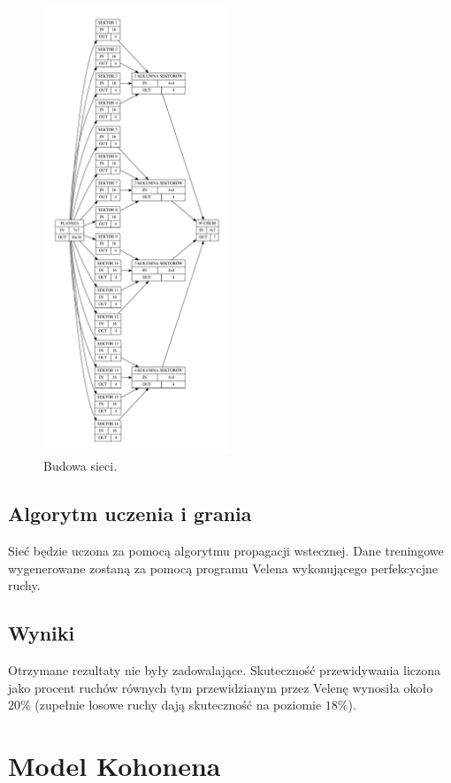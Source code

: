 \documentclass{llncs}
\begin{document}
\begin{figure}[H]
	\centering	
	\includegraphics[width=0.5\textwidth]{img/opis_sieci.pdf}	\caption{Budowa sieci.}
	\label{fig:Siec}
\end{figure}

\subsection{Algorytm uczenia i grania}
Sieć będzie uczona za pomocą algorytmu propagacji wstecznej. Dane treningowe wygenerowane zostaną za pomocą programu Velena\cite{velena} wykonującego perfekcycjne ruchy.

\subsection{Wyniki}
Otrzymane rezultaty nie były zadowalające. Skuteczność przewidywania liczona jako procent ruchów równych tym przewidzianym przez Velenę wynosiła około $20\%$ (zupełnie losowe ruchy dają skuteczność na poziomie $18\%$).

\section{Model Kohonena}
\end{document}
